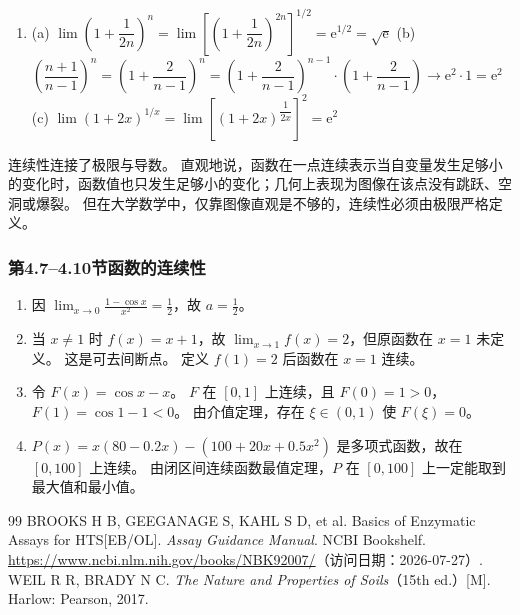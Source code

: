 \documentclass[fontset=fandol]{ctexart}
\newcommand{\ee}{\mathrm{e}}
\begin{document}
\begin{enumerate}
\item[10.] 
(a) \(\lim\left(1+\dfrac{1}{2n}\right)^n = \lim\left[\left(1+\dfrac{1}{2n}\right)^{2n}\right]^{1/2} = \ee^{1/2} = \sqrt{\ee}\) \quad
   (b) \(\left(\dfrac{n+1}{n-1}\right)^n = \left(1 + \dfrac{2}{n-1}\right)^n = \left(1 + \dfrac{2}{n-1}\right)^{n-1} \cdot \left(1 + \dfrac{2}{n-1}\right) \to \ee^2 \cdot 1 = \ee^2\) \quad
   (c) \(\lim (1+2x)^{1/x} = \lim \left[(1+2x)^{\dfrac{1}{2x}}\right]^2 = \ee^2\)
\end{enumerate}

连续性连接了极限与导数。 直观地说，函数在一点连续表示当自变量发生足够小的变化时，函数值也只发生足够小的变化；几何上表现为图像在该点没有跳跃、空洞或爆裂。 但在大学数学中，仅靠图像直观是不够的，连续性必须由极限严格定义。

\subsubsection*{第4.7--4.10节\quad 函数的连续性}

\begin{enumerate}[label=\textbf{练习\arabic*.},leftmargin=2.2em]
\item 因 $\lim_{x\to0}\frac{1-\cos x}{x^2}=\frac12$，故 $a=\frac12$。
\item 当 $x\neq1$ 时 $f(x)=x+1$，故 $\lim_{x\to1}f(x)=2$，但原函数在 $x=1$ 未定义。 这是可去间断点。 定义 $f(1)=2$ 后函数在 $x=1$ 连续。
\item 令 $F(x)=\cos x-x$。 $F$ 在 $[0,1]$ 上连续，且 $F(0)=1>0$，$F(1)=\cos1-1<0$。 由介值定理，存在 $\xi\in(0,1)$ 使 $F(\xi)=0$。
\item $P(x)=x(80-0.2x)-(100+20x+0.5x^2)$ 是多项式函数，故在 $[0,100]$ 上连续。 由闭区间连续函数最值定理，$P$ 在 $[0,100]$ 上一定能取到最大值和最小值。
\end{enumerate}

\fi


\begin{thebibliography}{99}
 BROOKS H B, GEEGANAGE S, KAHL S D, et al. Basics of Enzymatic Assays for HTS[EB/OL]. \emph{Assay Guidance Manual}. NCBI Bookshelf. \url{https://www.ncbi.nlm.nih.gov/books/NBK92007/}（访问日期：2026-07-27）.
 WEIL R R, BRADY N C. \emph{The Nature and Properties of Soils}（15th ed.）[M]. Harlow: Pearson, 2017.
\end{thebibliography}
\end{document}
